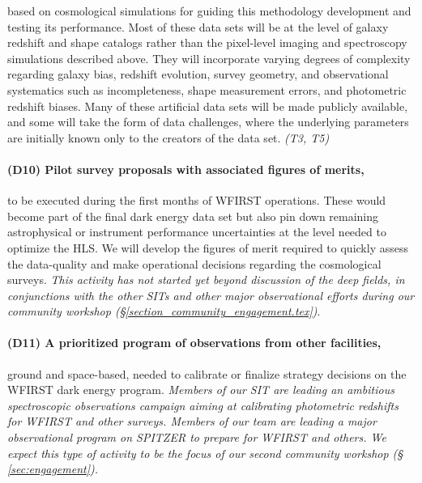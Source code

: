 based on cosmological simulations for
guiding this methodology development and testing its performance.
Most of these data sets will be at the level of galaxy redshift and shape
catalogs rather than the pixel-level imaging and spectroscopy simulations
described above.  They will incorporate varying degrees of complexity
regarding galaxy bias, redshift evolution, survey geometry, and
observational systematics such as incompleteness, shape measurement errors,
and photometric redshift biases.  Many of these artificial data sets
will be made publicly available, and some will take the form of data
challenges, where the underlying parameters are initially known only
to the creators of the data set. \textit{(T3, T5)}

\paragraph*{(D10) Pilot survey proposals with associated figures of merits,} to
be executed during the first months of WFIRST operations. These would become
part of the final dark energy data set but also pin down remaining astrophysical
or instrument performance uncertainties at the level needed to optimize the HLS.
We will develop the figures of merit required to quickly assess the data-quality
and make operational decisions regarding the cosmological surveys. \emph{This
activity has not started yet beyond discussion of the deep fields, in
conjunctions with the other SITs and other major observational efforts during
our community workshop (\S \ref{section_community_engagement.tex})}.

\paragraph*{(D11) A prioritized program of observations from other facilities,}
ground and space-based, needed to calibrate or finalize strategy decisions on
the WFIRST dark energy program. \emph{Members of our SIT are leading an
ambitious spectroscopic observations campaign aiming at calibrating photometric redshifts
for WFIRST and other surveys. Members of our team are leading a major
observational program on SPITZER to prepare for WFIRST and others. We expect
this type of activity to be the focus of our second community workshop (\S
\ref{sec:engagement}).}

